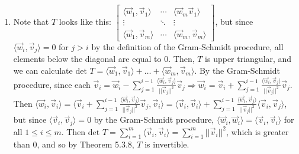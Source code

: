 \documentclass[10pt,english]{article}
\begin{document}
\begin{enumerate}
\pagebreak
\item Note that $T$ looks like this: $\begin{bmatrix}\langle\vec{w}_1,\vec{v}_1\rangle&\cdots&\langle\vec{w}_m\vec{v}_1\rangle\\\vdots&\ddots&\vdots\\\langle\vec{w}_1,\vec{v}_m\rangle&\cdots&\langle\vec{w}_m,\vec{v}_m\rangle\end{bmatrix}$, but since $\langle\vec{w}_i,\vec{v}_j\rangle=0$ for $j>i$ by the definition of the Gram-Schmidt procedure, all elements below the diagonal are equal to 0. Then, $T$ is upper triangular, and we can calculate $\text{det }T=\langle\vec{w}_1,\vec{v}_1\rangle+\ldots+\langle\vec{w}_m,\vec{v}_m\rangle$. By the Gram-Schmidt procedure, since each $\vec{v}_i=\vec{w}_i-\sum_{j=1}^{i-1}\frac{\langle\vec{w}_i,\vec{v}_j\rangle}{||\vec{v}_j||^2}\vec{v}_j\Rightarrow \vec{w}_i=\vec{v}_i+\sum_{j=1}^{i-1}\frac{\langle\vec{w}_i,\vec{v}_j\rangle}{||\vec{v}_j||^2}\vec{v}_j$. Then $\langle\vec{w}_i,\vec{v}_i\rangle=\langle\vec{v}_i+\sum_{j=1}^{i-1}\frac{\langle\vec{w}_i,\vec{v}_j\rangle}{||\vec{v}_j||^2}\vec{v}_j,\vec{v}_i\rangle=\langle\vec{v}_i,\vec{v}_i\rangle+\sum_{j=1}^{i-1}\frac{\langle\vec{w}_i,\vec{v}_j\rangle}{||\vec{v}_j||^2}\langle\vec{v}_i,\vec{v}_j\rangle$, but since $\langle\vec{v}_i,\vec{v}_j\rangle=0$ by the Gram-Schmidt procedure, $\langle\vec{w}_i,\vec{w}_i\rangle=\langle\vec{v}_i,\vec{v}_i\rangle$ for all $1\leq i\leq m$. Then $\text{det }T=\sum_{i=1}^{m}\langle\vec{v}_i,\vec{v}_i\rangle=\sum_{i=1}^m||\vec{v}_i||^2$, which is greater than 0, and so by Theorem 5.3.8, $T$ is invertible. 



\end{enumerate}
\end{document}
